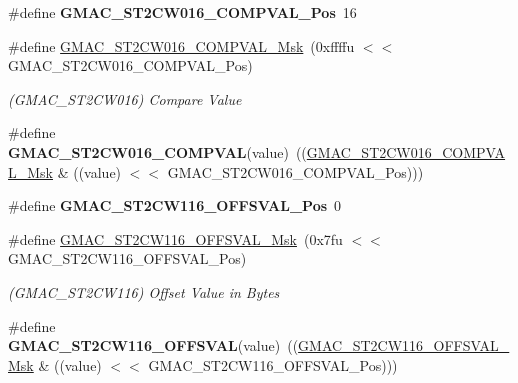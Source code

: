 \begin{DoxyCompactItemize}
\item 
\mbox{\label{group__SAMV71__GMAC_gaef1c5689897bbdcbd57b182c8d68c15e}} 
\#define {\bfseries G\+M\+A\+C\+\_\+\+S\+T2\+C\+W016\+\_\+\+C\+O\+M\+P\+V\+A\+L\+\_\+\+Pos}~16
\item 
\mbox{\label{group__SAMV71__GMAC_ga602eb37a57261f7768628f7eca2a1f5d}} 
\#define \mbox{\hyperlink{group__SAMV71__GMAC_ga602eb37a57261f7768628f7eca2a1f5d}{G\+M\+A\+C\+\_\+\+S\+T2\+C\+W016\+\_\+\+C\+O\+M\+P\+V\+A\+L\+\_\+\+Msk}}~(0xffffu $<$$<$ G\+M\+A\+C\+\_\+\+S\+T2\+C\+W016\+\_\+\+C\+O\+M\+P\+V\+A\+L\+\_\+\+Pos)
\begin{DoxyCompactList}\small\item\em (G\+M\+A\+C\+\_\+\+S\+T2\+C\+W016) Compare Value \end{DoxyCompactList}\item 
\mbox{\label{group__SAMV71__GMAC_gae4604be622d3a9c17c6abdc30772b3be}} 
\#define {\bfseries G\+M\+A\+C\+\_\+\+S\+T2\+C\+W016\+\_\+\+C\+O\+M\+P\+V\+AL}(value)~((\mbox{\hyperlink{group__SAMV71__GMAC_ga602eb37a57261f7768628f7eca2a1f5d}{G\+M\+A\+C\+\_\+\+S\+T2\+C\+W016\+\_\+\+C\+O\+M\+P\+V\+A\+L\+\_\+\+Msk}} \& ((value) $<$$<$ G\+M\+A\+C\+\_\+\+S\+T2\+C\+W016\+\_\+\+C\+O\+M\+P\+V\+A\+L\+\_\+\+Pos)))
\item 
\mbox{\label{group__SAMV71__GMAC_ga173ca3ec118fcc6a711ef4c747ca6493}} 
\#define {\bfseries G\+M\+A\+C\+\_\+\+S\+T2\+C\+W116\+\_\+\+O\+F\+F\+S\+V\+A\+L\+\_\+\+Pos}~0
\item 
\mbox{\label{group__SAMV71__GMAC_ga38880a28cfeeee7856cdc18be44ae4f7}} 
\#define \mbox{\hyperlink{group__SAMV71__GMAC_ga38880a28cfeeee7856cdc18be44ae4f7}{G\+M\+A\+C\+\_\+\+S\+T2\+C\+W116\+\_\+\+O\+F\+F\+S\+V\+A\+L\+\_\+\+Msk}}~(0x7fu $<$$<$ G\+M\+A\+C\+\_\+\+S\+T2\+C\+W116\+\_\+\+O\+F\+F\+S\+V\+A\+L\+\_\+\+Pos)
\begin{DoxyCompactList}\small\item\em (G\+M\+A\+C\+\_\+\+S\+T2\+C\+W116) Offset Value in Bytes \end{DoxyCompactList}\item 
\mbox{\label{group__SAMV71__GMAC_ga434a2fc0c8ff46743670a98735e019a3}} 
\#define {\bfseries G\+M\+A\+C\+\_\+\+S\+T2\+C\+W116\+\_\+\+O\+F\+F\+S\+V\+AL}(value)~((\mbox{\hyperlink{group__SAMV71__GMAC_ga38880a28cfeeee7856cdc18be44ae4f7}{G\+M\+A\+C\+\_\+\+S\+T2\+C\+W116\+\_\+\+O\+F\+F\+S\+V\+A\+L\+\_\+\+Msk}} \& ((value) $<$$<$ G\+M\+A\+C\+\_\+\+S\+T2\+C\+W116\+\_\+\+O\+F\+F\+S\+V\+A\+L\+\_\+\+Pos)))

\end{DoxyCompactItemize}

